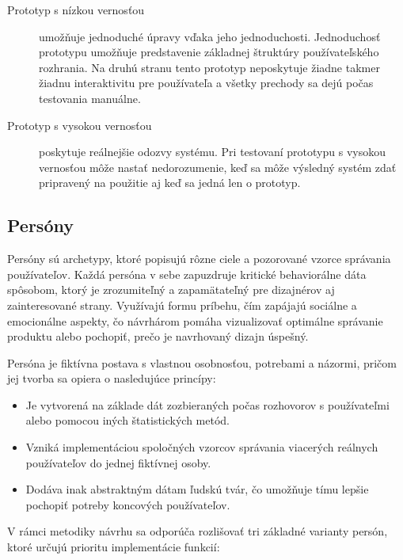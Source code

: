 \begin{description}
    \item [Prototyp s nízkou vernosťou] {
        umožňuje jednoduché úpravy vďaka jeho jednoduchosti. Jednoduchosť prototypu umožňuje predstavenie základnej štruktúry používateľského rozhrania. Na druhú stranu tento prototyp neposkytuje žiadne takmer žiadnu interaktivitu pre používateľa a všetky prechody sa dejú počas testovania manuálne. 
    }
    \item [Prototyp s vysokou vernosťou] {
        poskytuje reálnejšie odozvy systému. Pri testovaní prototypu s vysokou vernosťou môže nastať nedorozumenie, keď sa môže výsledný systém zdať pripravený na použitie aj keď sa jedná len o prototyp.
    }
\end{description}
\cite{prototypes,usability_testing}


\subsection{Persóny}\label{persony}
Persóny sú archetypy, ktoré popisujú rôzne ciele a pozorované vzorce správania používateľov. Každá persóna v sebe zapuzdruje kritické behaviorálne dáta spôsobom, ktorý je zrozumiteľný a zapamätateľný pre dizajnérov aj zainteresované strany. Využívajú formu príbehu, čím zapájajú sociálne a emocionálne aspekty, čo návrhárom pomáha vizualizovať optimálne správanie produktu alebo pochopiť, prečo je navrhovaný dizajn úspešný.

Persóna je fiktívna postava s vlastnou osobnosťou, potrebami a názormi, pričom jej tvorba sa opiera o nasledujúce princípy:
\begin{itemize}
\item Je vytvorená na základe dát zozbieraných počas rozhovorov s používateľmi alebo pomocou iných štatistických metód.
\item Vzniká implementáciou spoločných vzorcov správania viacerých reálnych používateľov do jednej fiktívnej osoby.
\item Dodáva inak abstraktným dátam ľudskú tvár, čo umožňuje tímu lepšie pochopiť potreby koncových používateľov.
\end{itemize}

V rámci metodiky návrhu sa odporúča rozlišovať tri základné varianty persón, ktoré určujú prioritu implementácie funkcií:


